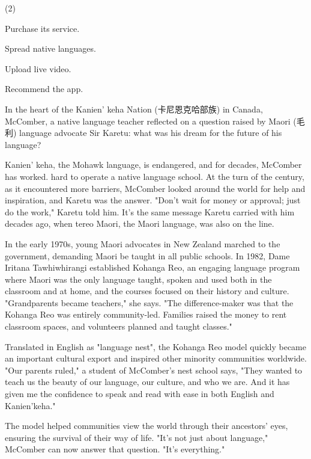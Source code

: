 \documentclass{英语试卷}
\begin{document}
\begin{choices}(2)
  \item Purchase its service.
  \item Spread native languages.
  \item Upload live video.
  \item Recommend the app.
\end{choices}
\par In the heart of the Kanien' keha Nation (卡尼恩克哈部族) in Canada, McComber, a native language teacher reflected on a question raised by Maori (毛利) language advocate Sir Karetu: what was his dream for the future of his language?\par
\par Kanien' keha, the Mohawk language, is endangered, and for decades, McComber has worked. hard to operate a native language school. At the turn of the century, as it encountered more barriers, McComber looked around the world for help and inspiration, and Karetu was the answer. "Don't wait for money or approval; just do the work," Karetu told him. It's the same message Karetu carried with him decades ago, when tereo Maori, the Maori language, was also on the line.\par
\par In the early 1970s, young Maori advocates in New Zealand marched to the government, demanding Maori be taught in all public schools. In 1982, Dame Iritana Tawhiwhirangi established Kohanga Reo, an engaging language program where Maori was the only language taught, spoken and used both in the classroom and at home, and the courses focused on their history and culture. "Grandparents became teachers," she says. "The difference-maker was that the Kohanga Reo was entirely community-led. Families raised the money to rent classroom spaces, and volunteers planned and taught classes."\par
\par Translated in English as "language nest", the Kohanga Reo model quickly became an important cultural export and inspired other minority communities worldwide. "Our parents ruled," a student of McComber's nest school says, "They wanted to teach us the beauty of our language, our culture, and who we are. And it has given me the confidence to speak and read with ease in both English and Kanien'keha."\par
\par The model helped communities view the world through their ancestors' eyes, ensuring the survival of their way of life. "It's not just about language," McComber can now answer that question. "It's everything."\par
\end{document}
